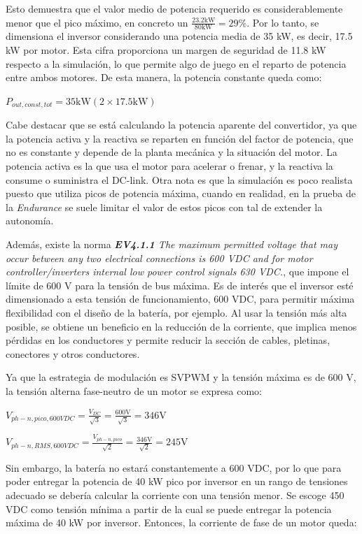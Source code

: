 Esto demuestra que el valor medio de potencia requerido es considerablemente menor que el pico máximo, en concreto un \(\frac{23.2 \text{kW}}{80 \text{kW}} = 29\%\). Por lo tanto, se dimensiona el inversor considerando una potencia media de 35 kW, es decir, 17.5 kW por motor. Esta cifra proporciona un margen de seguridad de 11.8 kW respecto a la simulación, lo que permite algo de juego en el reparto de potencia entre ambos motores. De esta manera, la potencia constante queda como:

\(P_{out, const, tot} = 35 \text{kW} (2 \times 17.5 \text{kW})\)

Cabe destacar que se está calculando la potencia aparente del convertidor, ya que la potencia activa y la reactiva se reparten en función del factor de potencia, que no es constante y depende de la planta mecánica y la situación del motor. La potencia activa es la que usa el motor para acelerar o frenar, y la reactiva la consume o suministra el DC-link. Otra nota es que la simulación es poco realista puesto que utiliza picos de potencia máxima, cuando en realidad, en la prueba de la \textit{Endurance} se suele limitar el valor de estos picos con tal de extender la autonomía.

Además, existe la norma \textit{\textbf{EV4.1.1} The maximum permitted voltage that may occur between any two electrical connections is 600 VDC and for motor controller/inverters internal low power control signals 630 VDC.}, que impone el límite de 600 V para la tensión de bus máxima. Es de interés que el inversor esté dimensionado a esta tensión de funcionamiento, 600 VDC, para permitir máxima flexibilidad con el diseño de la batería, por ejemplo. Al usar la tensión más alta posible, se obtiene un beneficio en la reducción de la corriente, que implica menos pérdidas en los conductores y permite reducir la sección de cables, pletinas, conectores y otros conductores.

Ya que la estrategia de modulación es SVPWM y la tensión máxima es de 600 V, la tensión alterna fase-neutro de un motor se expresa como:

\(V_{ph-n, pico, 600 VDC} = \frac{V_{DC}}{\sqrt{3}} = \frac{600 \text{V}}{\sqrt{3}} = 346 \text{V}\)

\(V_{ph-n, RMS, 600 VDC} = \frac{V_{ph-n, pico}}{\sqrt{2}} = \frac{346 \text{V}}{\sqrt{2}} = 245 \text{V}\)

Sin embargo, la batería no estará constantemente a 600 VDC, por lo que para poder entregar la potencia de 40 kW pico por inversor en un rango de tensiones adecuado se debería calcular la corriente con una tensión menor. Se escoge 450 VDC como tensión mínima a partir de la cual se puede entregar la potencia máxima de 40 kW por inversor. Entonces, la corriente de fase de un motor queda:

